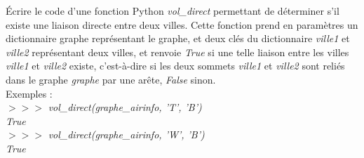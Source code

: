 \documentclass[a4paper, noanswers, addpoints, 12pt]{exam}
\begin{document}
\begin{questions}
\question[1] Écrire le code d'une fonction Python \textit{vol\_direct} permettant de déterminer s'il
existe une liaison directe entre deux villes. Cette fonction prend en paramètres
un dictionnaire graphe représentant le graphe, et deux clés du dictionnaire
\textit{ville1} et \textit{ville2} représentant deux villes, et renvoie \textit{True} si une telle liaison
entre les villes \textit{ville1} et \textit{ville2} existe, c'est-à-dire si les deux sommets
\textit{ville1} et \textit{ville2} sont reliés dans le graphe \textit{graphe} par une arête, \textit{False} sinon.\\

Exemples :\\
$>>>$ \textit{vol\_direct(graphe\_airinfo, 'T', 'B')}\\
\textit{True}\\
$>>>$ \textit{vol\_direct(graphe\_airinfo, 'W', 'B')}\\
\textit{True}
\end{questions}
\end{document}
